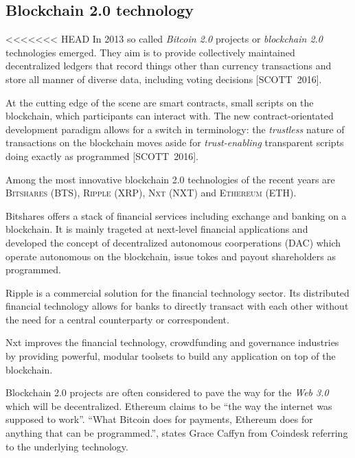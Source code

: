 \documentclass[9pt,oneside]{amsart}
\begin{document}
\begin{multicols}{2}
\subsection{Blockchain 2.0 technology}
<<<<<<< HEAD
In 2013 so called \textit{Bitcoin 2.0} projects or \textit{blockchain 2.0} technologies emerged. They aim is to provide collectively maintained decentralized ledgers that record things other than currency transactions and store all manner of diverse data, including voting decisions [SCOTT~2016].\par
At the cutting edge of the scene are smart contracts, small scripts on the blockchain, which participants can interact with. The new contract-orientated development paradigm allows for a switch in terminology: the \textit{trustless} nature of transactions on the blockchain moves aside for \textit{trust-enabling} transparent scripts doing exactly as programmed [SCOTT~2016].\par
Among the most innovative blockchain 2.0 technologies of the recent years are \textsc{Bitshares (BTS)}, \textsc{Ripple (XRP)}, \textsc{Nxt (NXT)} and \textsc{Ethereum (ETH)}.\par %
Bitshares offers a stack of financial services including exchange and banking on a blockchain. It is mainly trageted at next-level financial applications and developed the concept of decentralized autonomous coorperations (\textsc{DAC}) which operate autonomous on the blockchain, issue tokes and payout shareholders as programmed.\par
Ripple is a commercial solution for the financial technology sector. Its distributed financial technology allows for banks to directly transact with each other without the need for a central counterparty or correspondent.\par
Nxt improves the financial technology, crowdfunding and governance industries by providing powerful, modular toolsets to build any application on top of the blockchain.\par
Blockchain 2.0 projects are often considered to pave the way for the \textit{Web 3.0} which will be decentralized. Ethereum claims to be \enquote{the way the internet was supposed to work}. \enquote{What Bitcoin does for payments, Ethereum does for anything that can be programmed.}, states Grace Caffyn from Coindesk referring to the underlying technology.\par

\end{multicols}
\end{document}
